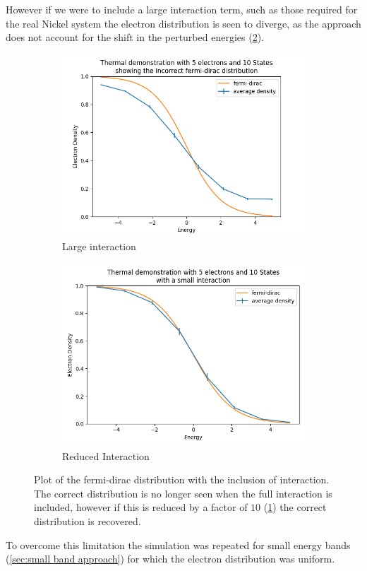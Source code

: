 However if we were to include
a large interaction term, such
as those required for the
real Nickel system the
electron distribution is
seen to diverge, as the approach
does not account for the
shift in the perturbed
energies (\cref{fig:incorrect fermi dirac}).
\begin{figure}[htbp]
    \centering
    \begin{subfigure}{0.45\linewidth}
        \centering
        \includegraphics[width =0.9 \linewidth]{Figures/Simulation/Plot of incorrect fermi dirac distribution on center.png}
        \caption{Large interaction}
    \end{subfigure}
    \hfill
    \begin{subfigure}{0.45\linewidth}
        \centering
        \includegraphics[width = 0.9\linewidth]{Figures/Simulation/Plot of incorrect fermi dirac distribution on center small interaction.png}
        \caption{Reduced Interaction}\label{sub@fig:reduced interaction fermi-dirac}
    \end{subfigure}
    \caption{Plot of the fermi-dirac distribution
        with the inclusion of interaction. The
        correct distribution is no longer seen when
        the full interaction is included, however
        if this is reduced by a factor of \(10\)
        (\cref{sub@fig:reduced interaction fermi-dirac})
        the correct distribution is recovered.}\label{fig:incorrect fermi dirac}
\end{figure}
To overcome this limitation
the simulation was repeated
for small energy bands (\cref{sec:small band approach})
for which the electron distribution
was uniform.

